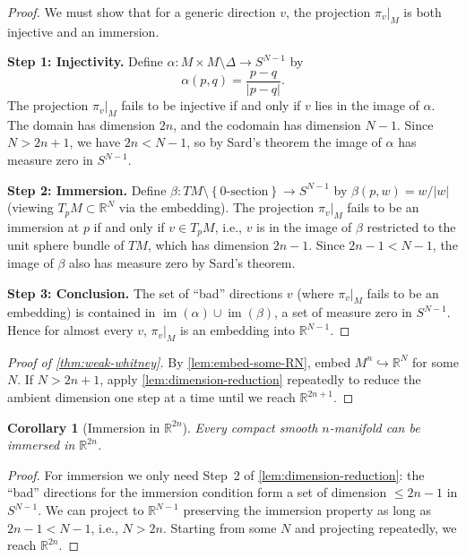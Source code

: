 \documentclass[12pt,a4paper,openany]{book}
\newtheorem{corollary}[theorem]{Corollary}
\theoremstyle{definition}
\theoremstyle{remark}
\newcommand{\R}{\mathbb{R}}
\newcommand{\abs}[1]{\left\lvert #1 \right\rvert}
\newcommand{\set}[1]{\left\{ #1 \right\}}
\begin{document}
\begin{proof}
We must show that for a generic direction $v$, the projection $\pi_v|_M$
is both injective and an immersion.

\textbf{Step 1: Injectivity.}
Define $\alpha\colon M\times M\setminus\Delta \to S^{N-1}$ by
\[
  \alpha(p,q) = \frac{p-q}{\abs{p-q}}.
\]
The projection $\pi_v|_M$ fails to be injective if and only if $v$
lies in the image of $\alpha$. The domain has dimension $2n$,
and the codomain has dimension $N-1$. Since $N > 2n+1$, we have
$2n < N-1$, so by Sard's theorem the image of $\alpha$ has measure
zero in $S^{N-1}$.

\textbf{Step 2: Immersion.}
Define $\beta\colon TM\setminus\set{0\text{-section}} \to S^{N-1}$ by
$\beta(p,w) = w/\abs{w}$ (viewing $T_pM \subset \R^N$ via the embedding).
The projection $\pi_v|_M$ fails to be an immersion at $p$ if and only
if $v \in T_pM$, i.e., $v$ is in the image of $\beta$ restricted to
the unit sphere bundle of $TM$, which has dimension $2n-1$.
Since $2n-1 < N-1$, the image of $\beta$ also has measure zero
by Sard's theorem.

\textbf{Step 3: Conclusion.}
The set of ``bad'' directions $v$ (where $\pi_v|_M$ fails to be
an embedding) is contained in $\operatorname{im}(\alpha)\cup\operatorname{im}(\beta)$,
a set of measure zero in $S^{N-1}$. Hence for almost every $v$,
$\pi_v|_M$ is an embedding into $\R^{N-1}$.
\end{proof}

\begin{proof}[Proof of \autoref{thm:weak-whitney}]
By \autoref{lem:embed-some-RN}, embed $M^n \hookrightarrow \R^N$ for some $N$.
If $N > 2n+1$, apply \autoref{lem:dimension-reduction} repeatedly to reduce
the ambient dimension one step at a time until we reach $\R^{2n+1}$.
\end{proof}

\begin{corollary}[Immersion in $\R^{2n}$]\label{cor:weak-immersion}
Every compact smooth $n$-manifold can be immersed in $\R^{2n}$.
\end{corollary}

\begin{proof}
For immersion we only need Step~2 of \autoref{lem:dimension-reduction}:
the ``bad'' directions for the immersion condition form a set of
dimension $\le 2n-1$ in $S^{N-1}$. We can project to $\R^{N-1}$
preserving the immersion property as long as $2n-1 < N-1$, i.e.,
$N > 2n$. Starting from some $N$ and projecting repeatedly, we reach
$\R^{2n}$.
\end{proof}
\end{document}

